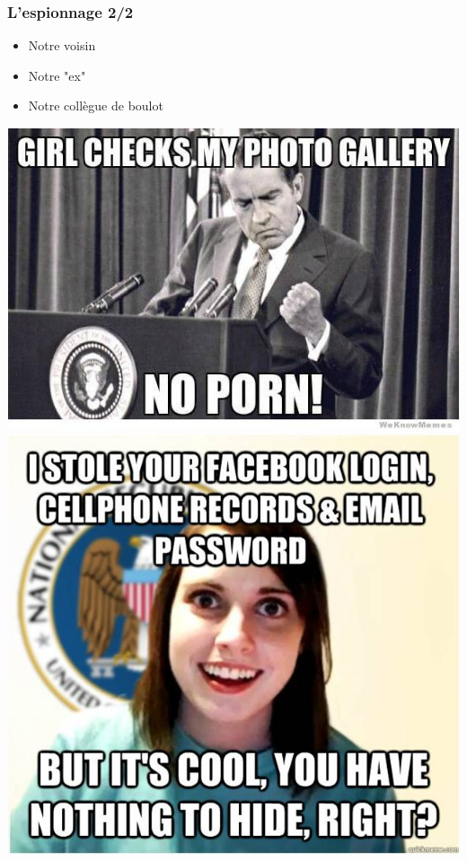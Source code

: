\documentclass{beamer}
\begin{document}
\begin{frame}
\frametitle{L'espionnage 2/2}
\begin{itemize}
\item Notre voisin
\item Notre "ex"
\item Notre collègue de boulot 
\end{itemize}
\includegraphics[scale=0.55]{./images/nixon.jpg}
\includegraphics[scale=0.4]{./images/girlfriend.jpg}
\end{frame}
\end{document}
